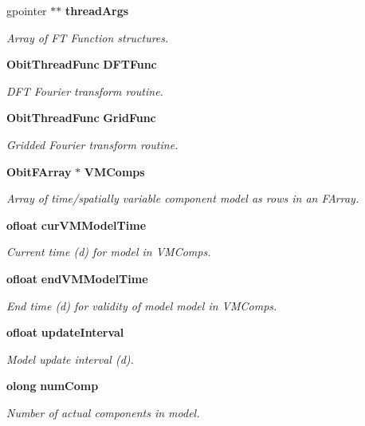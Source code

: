 \begin{CompactItemize}
gpointer $\ast$$\ast$ {\bf thread\-Args}
\begin{CompactList}\small\item\em Array of FT Function structures. \item\end{CompactList}\item 
{\bf Obit\-Thread\-Func} {\bf DFTFunc}
\begin{CompactList}\small\item\em DFT Fourier transform routine. \item\end{CompactList}\item 
{\bf Obit\-Thread\-Func} {\bf Grid\-Func}
\begin{CompactList}\small\item\em Gridded Fourier transform routine. \item\end{CompactList}\item 
{\bf Obit\-FArray} $\ast$ {\bf VMComps}
\begin{CompactList}\small\item\em Array of time/spatially variable component model as rows in an FArray. \item\end{CompactList}\item 
{\bf ofloat} {\bf cur\-VMModel\-Time}
\begin{CompactList}\small\item\em Current time (d) for model in VMComps. \item\end{CompactList}\item 
{\bf ofloat} {\bf end\-VMModel\-Time}
\begin{CompactList}\small\item\em End time (d) for validity of model model in VMComps. \item\end{CompactList}\item 
{\bf ofloat} {\bf update\-Interval}
\begin{CompactList}\small\item\em Model update interval (d). \item\end{CompactList}\item 
{\bf olong} {\bf num\-Comp}
\begin{CompactList}\small\item\em Number of actual components in model. \item\end{CompactList}\end{CompactItemize}


